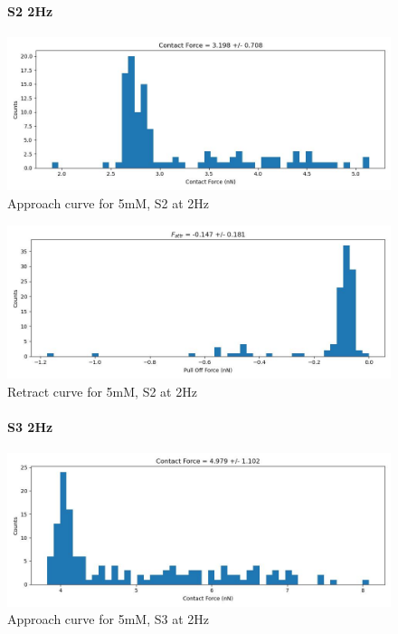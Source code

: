 \begin{figure}[h!]
\paragraph{S2 2Hz}
\centering
\includegraphics[width=\textwidth]{chapter7/Tip speed/5mM/S2 2Hz/approach_f_c_hist.jpg}
\caption{Approach curve for 5mM, S2 at 2Hz}
\end{figure}

\begin{figure}[h!]
\centering
\includegraphics[width=\textwidth]{chapter7/Tip speed/5mM/S2 2Hz/retract_f_a_hist.jpg}
\caption{Retract curve for 5mM, S2 at 2Hz}
\end{figure}
\newpage


\begin{figure}[h!]
\paragraph{S3 2Hz}
\centering
\includegraphics[width=\textwidth]{chapter7/Tip speed/5mM/S3 2Hz/approach_f_c_hist.jpg}
\caption{Approach curve for 5mM, S3 at 2Hz}
\end{figure}

